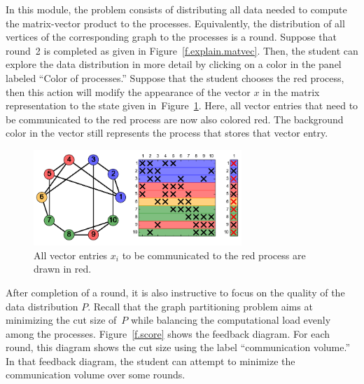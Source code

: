 \documentclass[12pt, twoside,a4paper,toc=bibliography]{scrbook}
\newcommand{\figref}[1]{Figure~\protect\ref{#1}}
\begin{document}
In this module, the problem consists of distributing all data needed to
compute the matrix-vector product to the processes. Equivalently, the distribution of all
vertices of the corresponding graph to the processes is a round. Suppose that round~2 is
completed as given in \figref{f.explain.matvec}. Then, the student can explore the data distribution in
more detail by clicking on a color in the panel labeled ``Color of processes.'' Suppose
that the student chooses the red process, then this action will modify the appearance of
the vector $x$ in the matrix representation to the state given
in~\figref{f.communication}. Here, all vector entries that need to be communicated to the
red process are now also colored red.
The background color in the vector still represents the process
that stores that vector entry.

\begin{figure}
\centering
\includegraphics[width=0.7\textwidth]{redComm}
\caption{All vector entries $x_i$ to be communicated to the red process are drawn in red.}
\label{f.communication}
\end{figure}

After completion of a round, it is also instructive to focus on the quality of the data
distribution $P$. Recall that the graph partitioning problem aims at minimizing the cut
size of~$P$ while balancing the computational load evenly among the processes.
\figref{f.score} shows the feedback diagram. For each round, this diagram shows the cut size
using the label ``communication volume.''
In that feedback diagram, the student can attempt to minimize the communication volume over some rounds.
\end{document}
